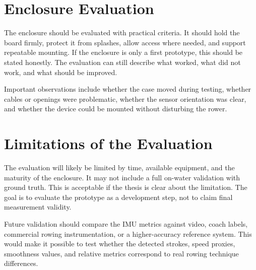 \section{Enclosure Evaluation}

The enclosure should be evaluated with practical criteria. It should hold the board firmly, protect it from splashes, allow access where needed, and support repeatable mounting. If the enclosure is only a first prototype, this should be stated honestly. The evaluation can still describe what worked, what did not work, and what should be improved.

Important observations include whether the case moved during testing, whether cables or openings were problematic, whether the sensor orientation was clear, and whether the device could be mounted without disturbing the rower.

\section{Limitations of the Evaluation}

The evaluation will likely be limited by time, available equipment, and the maturity of the enclosure. It may not include a full on-water validation with ground truth. This is acceptable if the thesis is clear about the limitation. The goal is to evaluate the prototype as a development step, not to claim final measurement validity.

Future validation should compare the IMU metrics against video, coach labels, commercial rowing instrumentation, or a higher-accuracy reference system. This would make it possible to test whether the detected strokes, speed proxies, smoothness values, and relative metrics correspond to real rowing technique differences.
